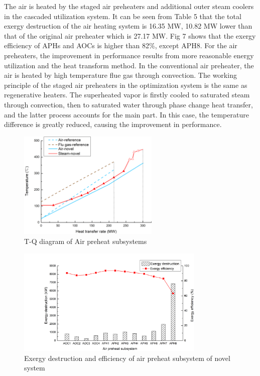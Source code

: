 \documentclass[preprint,12pt]{elsarticle}
\begin{document}
The air is heated by the staged air preheaters and additional outer steam coolers in the cascaded utilization system.
 It can be seen from Table 5 that the total exergy destruction of the air heating system is 16.35 MW, 10.82 MW lower than that of the original air preheater which is 27.17 MW. 
 Fig 7 shows that the exergy efficiency of APHs and AOCs is higher than 82\%, except APH8.
 For the air preheaters, the improvement in performance results from more reasonable energy utilization and the heat transform method. 
 In the conventional air preheater, the air is heated by high temperature flue gas through convection. 
 The working principle of the staged air preheaters in the optimization system is the same as regenerative heaters. 
 The superheated vapor is firstly cooled to saturated steam through convection, then to saturated water through phase change heat transfer, and the latter process accounts for the main part. 
 In this case, the temperature difference is greatly reduced, causing the improvement in performance.

\begin{figure}[htbp]
\centering
\includegraphics[width=0.6\textwidth]{fig/APH_temper_compare.png}
\caption{T-Q diagram of Air preheat subsystems} 
\label{fig:APH_temper_compare}
\end{figure}

\begin{figure}[htbp]
\centering
\includegraphics[width=0.8\textwidth]{fig/novel_APH_exergy.png}
\caption{Exergy destruction and efficiency of air preheat subsystem of novel system} 
\label{fig:novel_APH_exergy}
\end{figure}
\end{document}
